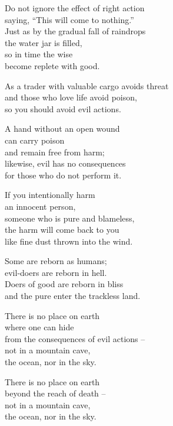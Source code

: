 Do not ignore the effect of right action\\
saying, “This will come to nothing.”\\
Just as by the gradual fall of raindrops\\
the water jar is filled,\\
so in time the wise\\
become replete with good.


As a trader with valuable cargo avoids threat\\
and those who love life avoid poison,\\
so you should avoid evil actions.


A hand without an open wound\\
can carry poison\\
and remain free from harm;\\
likewise, evil has no consequences\\
for those who do not perform it.


If you intentionally harm\\
an innocent person,\\
someone who is pure and blameless,\\
the harm will come back to you\\
like fine dust thrown into the wind.


Some are reborn as humans;\\
evil-doers are reborn in hell.\\
Doers of good are reborn in bliss\\
and the pure enter the trackless land.


There is no place on earth\\
where one can hide\\
from the consequences of evil actions --\\
not in a mountain cave,\\
the ocean, nor in the sky.


There is no place on earth\\
beyond the reach of death --\\
not in a mountain cave,\\
the ocean, nor in the sky.

